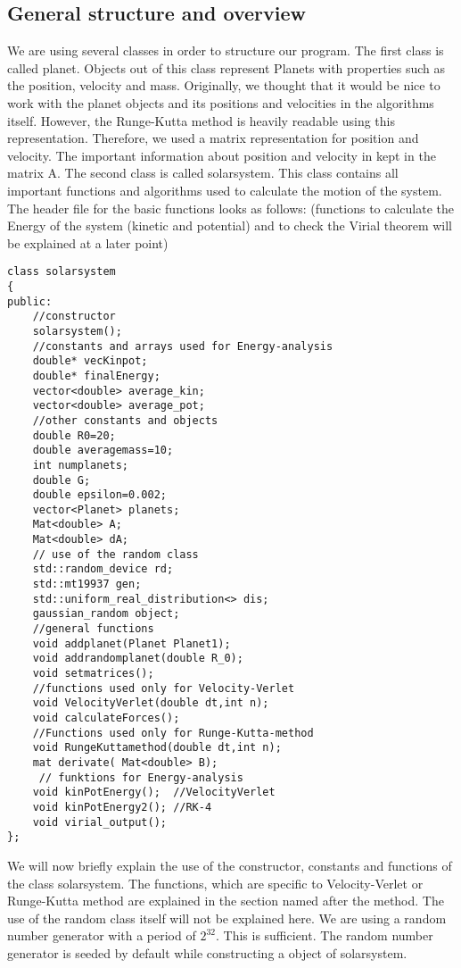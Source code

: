 \documentclass[10pt,a4paper]{article}
\begin{document}
\subsection{General structure and overview}
We are using several classes in order to structure our program. The first class is called planet. Objects out of this class represent Planets with properties such as the position, velocity and mass. Originally, we thought that it would be nice to work with the planet objects and its positions and velocities in the algorithms itself. However, the Runge-Kutta method is heavily readable using this representation. Therefore, we used a matrix representation for position and velocity. The important information about position and velocity in kept in the matrix A. 
The second class is called solarsystem. This class contains all important functions and algorithms used to calculate the motion of the system. 
The header file for the basic functions looks as follows: (functions to calculate the Energy of the system (kinetic and potential) and to check the Virial theorem will be explained at a later point)
\begin{lstlisting}
class solarsystem
{
public:
    //constructor
    solarsystem();
    //constants and arrays used for Energy-analysis
    double* vecKinpot;
    double* finalEnergy;
    vector<double> average_kin; 
    vector<double> average_pot; 
    //other constants and objects 
    double R0=20;
    double averagemass=10;
    int numplanets;
    double G;
    double epsilon=0.002;
    vector<Planet> planets;
    Mat<double> A;
    Mat<double> dA;
    // use of the random class
    std::random_device rd;
    std::mt19937 gen;
    std::uniform_real_distribution<> dis;
    gaussian_random object;
    //general functions
    void addplanet(Planet Planet1);
    void addrandomplanet(double R_0);
    void setmatrices();
    //functions used only for Velocity-Verlet
    void VelocityVerlet(double dt,int n);
    void calculateForces();
    //Functions used only for Runge-Kutta-method
    void RungeKuttamethod(double dt,int n);
    mat derivate( Mat<double> B);
     // funktions for Energy-analysis
    void kinPotEnergy();  //VelocityVerlet
    void kinPotEnergy2(); //RK-4
    void virial_output();
};
\end{lstlisting}
We will now briefly explain the use of the constructor, constants and functions of the class solarsystem. The functions, which are specific to Velocity-Verlet or Runge-Kutta method are explained in the section named after the method. The use of the random class itself will not be explained here. We are using a random number generator with a period of $2^{32}$. This is sufficient. The random number generator is seeded by default while constructing a object of solarsystem. 
\end{document}
